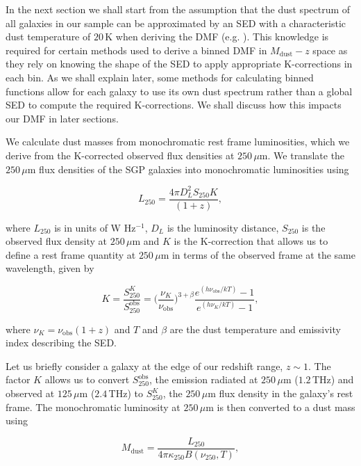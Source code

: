 In the next section we shall start from the assumption that the dust spectrum of all galaxies in our sample can be approximated by an SED with a characteristic dust temperature of $20\,$K when deriving the DMF (e.g. \citealt{Vlahakis_2005}). This knowledge is required for certain methods used to derive a binned DMF in $M_{\textrm{dust}}-z$ space as they rely on knowing the shape of the SED to apply appropriate K-corrections in each bin. As we shall explain later, some methods for calculating binned functions allow for each galaxy to use its own dust spectrum rather than a global SED to compute the required K-corrections. We shall discuss how this impacts our DMF in later sections.

We calculate dust masses from monochromatic rest frame luminosities, which we derive from the K-corrected observed flux densities at $250\,\mu$m. We translate the $250\,\mu$m flux densities of the SGP galaxies into monochromatic luminosities using

\begin{equation}
    L_{250} = \frac{4\pi D_L^2 S_{250}K}{(1+z)},
\label{eq:monohromatic_luminosities}
\end{equation}

\noindent where $L_{250}$ is in units of W Hz$^{-1}$, $D_L$ is the luminosity distance, $S_{250}$ is the observed flux density at $250\,\mu$m and $K$ is the K-correction that allows us to define a rest frame quantity at $250\,\mu$m in terms of the observed frame at the same wavelength, given by

\begin{equation}
    K = \frac{S_{250}^{K}}{S_{250}^{\textrm{obs}}} = \Bigg(\frac{\nu_{K}}{\nu_{\textrm{obs}}}\Bigg)^{3+\beta}\frac{e^{(h\nu_{\textrm{obs}}/kT)} - 1}{e^{(h\nu_{K}/kT)} - 1},
\label{eq:k_correction}
\end{equation}

\noindent where $\nu_{K} = \nu_{\textrm{obs}}(1+z)$ and $T$ and $\beta$ are the dust temperature and emissivity index describing the SED. 

Let us briefly consider a galaxy at the edge of our redshift range, $z \sim 1$. The factor $K$ allows us to convert $S_{250}^{\textrm{obs}}$, the emission radiated at $250\,\mu$m ($1.2\,$THz) and observed at $125\,\mu$m ($2.4\,$THz) to $S_{250}^{K}$, the $250\,\mu$m flux density in the galaxy's rest frame. The monochromatic luminosity at $250\,\mu$m is then converted to a dust mass using

\begin{equation}
    M_{\textrm{dust}} = \frac{L_{250}}{4\pi\kappa_{250}B(\nu_{250}, T)},
\label{fig:dust_mass}
\end{equation}

